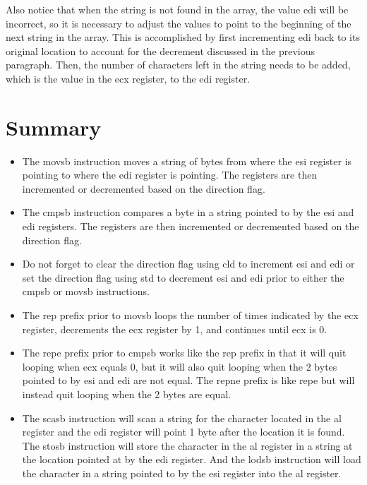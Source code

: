 \documentclass[10pt]{book}
\begin{document}
Also notice that when the string is not found in the array, the value edi will be incorrect, so it is necessary to adjust the values to point to the beginning of the next string in the array. This is accomplished by first incrementing edi back to its original location to account for the decrement discussed in the previous paragraph. Then, the number of characters left in the string needs to be added, which is the value in the ecx register, to the edi register.

\section{Summary}
\begin{itemize}
  \item The movsb instruction moves a string of bytes from where the esi register is pointing to where the edi register is pointing. The registers are then incremented or decremented based on the direction flag.
  \item The cmpsb instruction compares a byte in a string pointed to by the esi and edi registers. The registers are then incremented or decremented based on the direction flag.
  \item Do not forget to clear the direction flag using cld to increment esi and edi or set the direction flag using std to decrement esi and edi prior to either the cmpsb or movsb instructions.
  \item The rep prefix prior to movsb loops the number of times indicated by the ecx register, decrements the ecx register by 1, and continues until ecx is 0.
  \item The repe prefix prior to cmpsb works like the rep prefix in that it will quit looping when ecx equals 0, but it will also quit looping when the 2 bytes pointed to by esi and edi are not equal. The repne prefix is like repe but will instead quit looping when the 2 bytes are equal.
  \item The scasb instruction will scan a string for the character located in the al register and the edi register will point 1 byte after the location it is found. The stosb instruction will store the character in the al register in a string at the location pointed at by the edi register. And the lodsb instruction will load the character in a string pointed to by the esi register into the al register.
\end{itemize}
\end{document}
